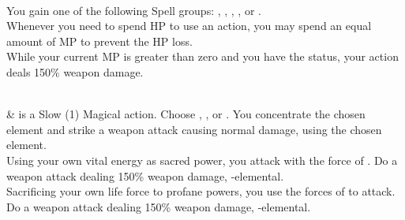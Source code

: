 \begin{tabjob}
    \\
    \tabjobspec{}

         You gain one of the following Spell groups: , , , , or . \\

         Whenever you need to spend HP to use an action, you may spend an equal amount of MP to prevent the HP loss. \\

         While your current MP is greater than zero and you have the  status, your  action deals 150\% weapon damage. \\

    \tabjobsep%

    \\

         & %
         is a Slow (1) Magical action. Choose , , or . You concentrate the chosen element and strike a weapon attack causing normal damage, using the chosen element. \\

         Using your own vital energy as sacred power, you attack with the force of . Do a weapon attack dealing 150\% weapon damage, -elemental. \\

         Sacrificing your own life force to profane powers, you use the forces of  to attack. Do a weapon attack dealing 150\% weapon damage, -elemental. \\
    
    \tabjobspec{}
    

\end{tabjob}
